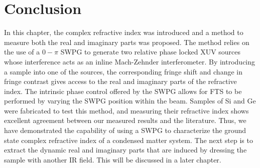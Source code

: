 \section{Conclusion}
In this chapter, the complex refractive index was introduced and a method to measure both the real and imaginary parts was proposed. The method relies on the use of a $0-\pi$ SWPG to generate two relative phase locked XUV sources whose interference acts as an inline Mach-Zehnder interferometer.  By introducing a sample into one of the sources, the corresponding fringe shift and change in fringe contrast gives access to the real and imaginary parts of the refractive index. The intrinsic phase control offered by the SWPG allows for FTS to be performed by varying the SWPG position within the beam. Samples of Si and Ge were fabricated to test this method, and measuring their refractive index shows excellent agreement between our measured results and the literature. Thus, we have demonstrated the capability of using a SWPG to characterize the ground state complex refractive index of a condensed matter system.  The next step is to extract the dynamic real and imaginary parts that are induced by dressing the sample with another IR field.  This will be discussed in a later chapter.



